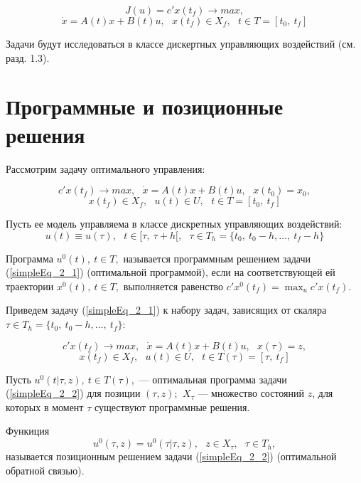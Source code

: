 \begin{equation}
    J(u) = c'x(t_f) \to max,
\end{equation} 
\[ \dot x = A(t)x + B(t)u,~~~x(t_f) \in X_f,~~~t \in T = [t_0,~t_f]\]

Задачи будут исследоваться в классе дискертных управляющих воздействий (см. разд. 1.3).


\section{Программные и позиционные решения}
Рассмотрим задачу оптимального управления:


\begin{equation}\label{simpleEq_2_1}
    c'x(t_f) \to max,~~~\dot x = A(t)x + B(t)u,~~~x(t_0) = x_0,
\end{equation} 
\[ x(t_f) \in X_f,~~~u(t) \in U, ~~~t \in T = [t_0,~t_f]\]


Пусть ее модель управляема в классе дискретных управляющих воздействий:
\[u(t) \equiv u(\tau), ~~~t \in [\tau, ~\tau + h[,~~~ \tau \in T_h = \{t_0,~ t_0 - h, \dots ,~ t_f - h\} \]


\begin{definition}   Программа $u^0(t), ~t \in T,$ называется программным решением задачи (\ref{simpleEq_2_1}) (оптимальной программой), если на соответствующей ей траектории $x^0(t), ~t \in T,$ выполняется равенство $c'x^0(t_f) = \max_u c'x(t_f) $.
\end{definition}


Приведем задачу (\ref{simpleEq_2_1}) к набору задач, зависящих от скаляра $\tau \in T_h = \{t_0,~ t_0 - h, \dots ,~ t_f\}$:


\begin{equation}\label{simpleEq_2_2}
    c'x(t_f) \to max,~~~\dot x = A(t)x + B(t)u,~~~x(\tau) = z,
\end{equation} 
\[ x(t_f) \in X_f, ~~~u(t) \in U ,~~~t \in T(\tau) = [\tau,~t_f]\]


Пусть $ u^0(t|\tau, z),~ t \in T(\tau), $ --- оптимальная программа задачи (\ref{simpleEq_2_2}) для позиции $(\tau, z)$; $~X_\tau$ --- множество состояний $z$, для которых в момент $\tau$ существуют программные решения.


\begin{definition}   Функиция
\[ u^0(\tau, z) = u^0(\tau|\tau, z),~~~ z \in X_\tau,~~~ \tau \in T_h,\]
называется позиционным решением задачи (\ref{simpleEq_2_2}) (оптимальной обратной связью).
\end{definition}
 

